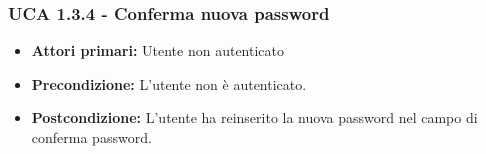 \subsubsection{UCA 1.3.4 - Conferma nuova password}
\begin{itemize}
\item \textbf{Attori primari:} Utente non autenticato
\item \textbf{Precondizione:} L'utente non è autenticato.
\item \textbf{Postcondizione:} L'utente ha reinserito la nuova password nel campo di conferma password.
\end{itemize}